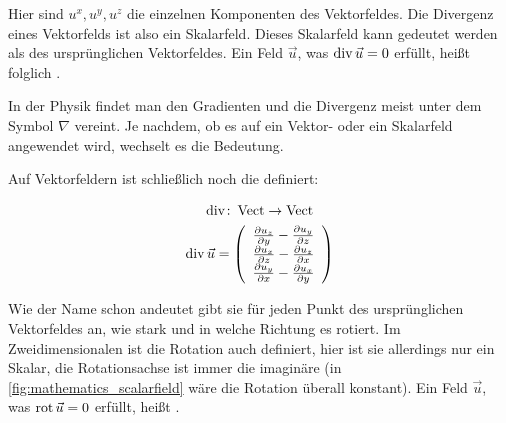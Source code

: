 Hier sind $u^x,u^y,u^z$ die einzelnen Komponenten des Vektorfeldes. Die
Divergenz eines Vektorfelds ist also ein Skalarfeld. Dieses Skalarfeld kann
gedeutet werden als  des ursprünglichen
Vektorfeldes. Ein Feld $\vec{u}$, was $\operatorname*{div} \vec{u}=0$ erfüllt, heißt
folglich .

In der Physik findet man den Gradienten und die Divergenz meist unter dem Symbol
$\nabla$ vereint. Je nachdem, ob es auf ein Vektor- oder ein Skalarfeld
angewendet wird, wechselt es die Bedeutung.

Auf Vektorfeldern ist schließlich noch die  definiert:

\begin{gather}
\operatorname*{div} \colon \operatorname*{Vect} \to \operatorname*{Vect} \\
\operatorname*{div} \vec{u}
=
\left(
	\begin{array}{c}
		\frac{\partial u_z}{\partial y} - \frac{\partial u_y}{\partial z} \\
		\frac{\partial u_x}{\partial z} - \frac{\partial u_z}{\partial x} \\
		\frac{\partial u_y}{\partial x} - \frac{\partial u_x}{\partial y}
	\end{array}
\right)
\end{gather}

Wie der Name schon andeutet gibt sie für jeden Punkt des ursprünglichen
Vektorfeldes an, wie stark und in welche Richtung es rotiert. Im
Zweidimensionalen ist die Rotation auch definiert, hier ist sie allerdings nur
ein Skalar, die Rotationsachse ist immer die imaginäre 
(in \autoref{fig:mathematics_scalarfield} wäre die Rotation überall konstant). Ein
Feld $\vec{u}$, was $\operatorname*{rot} \vec{u}=0$ erfüllt, heißt
.

